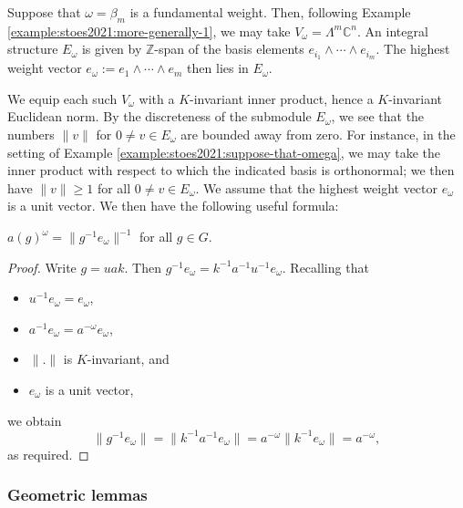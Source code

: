 \documentclass[reqno]{amsart} 
\begin{document}
\begin{example}\label{example:stoes2021:suppose-that-omega}
  Suppose that $\omega = \beta_m$ is a fundamental weight.  Then, following Example \ref{example:stoes2021:more-generally-1}, we may take $V_\omega = \Lambda^m \mathbb{C}^n$.  An integral structure $E_\omega$ is given by $\mathbb{Z}$-span of the basis elements $e_{i_1} \wedge \dotsb \wedge e_{i_m}$.  The highest weight vector $e_\omega := e_1 \wedge \dotsb \wedge e_m$ then lies in $E_\omega$.
\end{example}

We equip each such $V_\omega$ with a $K$-invariant inner product, hence a $K$-invariant Euclidean norm.  By the discreteness of the submodule $E_\omega$, we see that the numbers $\|v\|$ for $0 \neq v \in E_\omega$ are bounded away from zero.  For instance, in the setting of Example \ref{example:stoes2021:suppose-that-omega}, we may take the inner product with respect to which the indicated basis is orthonormal; we then have $\|v\| \geq 1$ for all $0 \neq v \in E_\omega$.  We assume that the highest weight vector $e_\omega$ is a unit vector.  We then have the following useful formula:

\begin{lemma}\label{lem:stoes2021:agomega-=-g}
  $a(g)^{\omega} = \|g^{-1} e_\omega \|^{-1}$ for all $g \in G$.
\end{lemma}
\begin{proof}
  Write $g = u a k$.  Then $g^{-1} e_\omega = k^{-1} a^{-1} u^{-1} e_\omega$.  Recalling that
  \begin{itemize}
  \item $u^{-1} e_\omega = e_\omega$,
  \item $a^{-1} e_\omega = a^{-\omega} e_\omega$,
  \item $\|.\|$ is $K$-invariant, and
  \item $e_\omega$ is a unit vector,
  \end{itemize}
  we obtain
  \begin{equation*}
    \|g^{-1} e_\omega \| = \|k^{-1} a^{-1} e_\omega \| = a^{-\omega} \|k^{-1} e_\omega \| = a^{-\omega},
  \end{equation*}
  as required.
\end{proof}


\subsubsection{Geometric lemmas}
\end{document}
